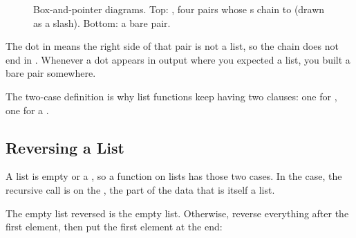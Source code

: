 \begin{figure}[htbp]
\centering
{}
\caption{Box-and-pointer diagrams. Top: , four pairs whose s chain to  (drawn as a slash). Bottom: a bare pair.}
\label{fig:boxptr}
\end{figure}

\begin{pitfall}
The dot in  means the right side of that pair is not a list, so the chain does not end in . Whenever a dot appears in output where you expected a list, you built a bare pair somewhere.
\end{pitfall}

The two-case definition is why list functions keep having two  clauses: one for , one for a .

\subsection{Reversing a List}

\begin{keypoint}
A list is empty or a , so a function on lists has those two cases. In the  case, the recursive call is on the , the part of the data that is itself a list.
\end{keypoint}

The empty list reversed is the empty list. Otherwise, reverse everything after the first element, then put the first element at the end:

